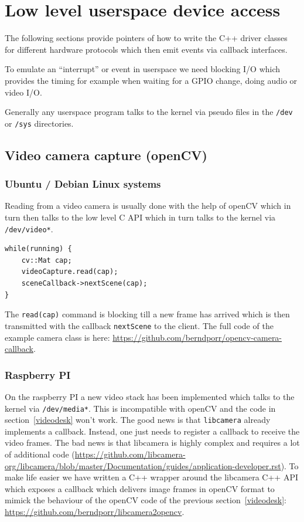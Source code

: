\documentclass[12pt]{report}
\begin{document}
\section{Low level userspace device access}
The following sections provide pointers of how to write
the C++ driver classes for different hardware protocols which then emit events via callback interfaces.

To emulate an ``interrupt'' or event in userspace we need blocking I/O which provides the timing for example
when waiting for a GPIO change, doing audio or video I/O.

Generally any userspace program talks to the kernel via pseudo files in the \texttt{/dev} or \texttt{/sys}
directories.



\subsection{Video camera capture (openCV)}
\subsubsection{Ubuntu / Debian Linux systems\label{videodesk}}
Reading from a video camera is usually done with the help of openCV which
in turn then talks to the low level C API which in turn talks to the kernel
via \texttt{/dev/video*}.
\begin{verbatim}
while(running) {
    cv::Mat cap;
    videoCapture.read(cap);
    sceneCallback->nextScene(cap);
}
\end{verbatim}
The \texttt{read(cap)} command is blocking till a new frame has
arrived which is then transmitted with the callback \texttt{nextScene}
to the client. The full code of the example camera class is here:
\url{https://github.com/berndporr/opencv-camera-callback}.


\subsubsection{Raspberry PI}
On the raspberry PI a new video stack has been implemented which talks
to the kernel via \texttt{/dev/media*}. This is incompatible with
openCV and the code in section~\ref{videodesk} won't work. The good
news is that \texttt{libcamera} already implements a callback. Instead, one just needs to register a
callback to receive the video frames. The bad news is that libcamera
is highly complex and requires a lot of additional code
(\url{https://github.com/libcamera-org/libcamera/blob/master/Documentation/guides/application-developer.rst}).
To make life easier we have written a C++ wrapper around the libcamera C++ API
which exposes a callback which delivers image frames in openCV format to
mimick the behaviour of the openCV code of the previous
section~\ref{videodesk}:
\url{https://github.com/berndporr/libcamera2opencv}.
\end{document}
